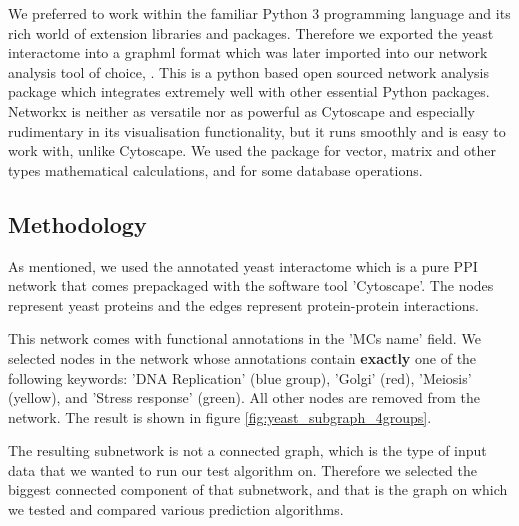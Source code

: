 We preferred to work within the familiar Python 3 programming
language and its rich world of extension libraries and packages.
Therefore we exported the yeast interactome into a graphml format
which was later imported into our network analysis tool of choice,
\textcite{networkx}. This is a python based open sourced network analysis 
package which integrates extremely well with other essential Python
packages. Networkx is neither as versatile nor as powerful as Cytoscape and
especially rudimentary in its visualisation functionality, but it
runs smoothly and is easy to work with, unlike Cytoscape.
We used the \textcite{numpy} package for vector, matrix and other
types mathematical
calculations, and \textcite{pandas} for some database operations. 

\subsection{Methodology}
As mentioned, we 
used the annotated yeast interactome which is a pure PPI network that comes
prepackaged with the
software tool 'Cytoscape'. The nodes represent yeast proteins and the edges
represent protein-protein interactions.

This network comes with functional annotations in the 'MCs name' field.
We selected nodes in the network whose annotations contain
\textbf{exactly} one of the following keywords:  'DNA Replication' (blue
group), 'Golgi' (red), 'Meiosis' (yellow), and 'Stress response'
(green). All other nodes are removed from the network.  The result is
shown in figure \ref{fig:yeast_subgraph_4groups}.

The resulting subnetwork is not a connected graph, which is the type
of input data that we wanted to run our test algorithm on. Therefore
we selected the biggest connected component of that subnetwork, and
that is the graph on which we tested and compared various prediction
algorithms.

